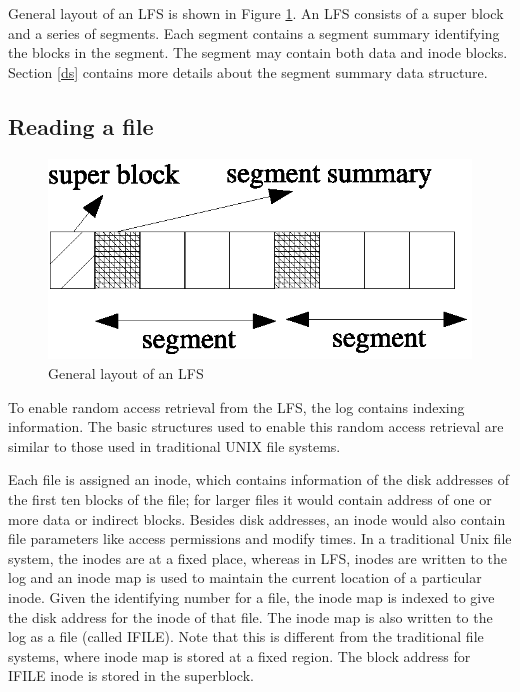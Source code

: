 \documentclass{article}
\begin{document}
General layout of an LFS is shown in Figure \ref{gen_struct}. An LFS consists
of a super block and a series of segments. Each segment contains a segment
summary identifying the blocks in the segment.  The segment may contain both
data and inode blocks. Section \ref{ds} contains more details about the
segment summary data structure.

\subsection{Reading a file}
\begin{figure}
\centering
\includegraphics[scale=0.7]{lfs1}
\caption{General layout of an LFS}
\label{gen_struct}
\end{figure}

To enable random access retrieval from the LFS, the log contains indexing
information. The basic structures used to enable this random  access retrieval 
are similar to those used in traditional UNIX file systems.

Each file is assigned an inode, which contains information of the disk
addresses of the first ten blocks of the file; for larger files it would
contain address of one or more data or indirect blocks. Besides disk
addresses, an inode would also contain file parameters like access permissions
and modify times. In a traditional Unix file system, the inodes are at a fixed
place, whereas in LFS, inodes are written to the log and an inode map is used
to maintain the current location of a particular inode. Given the identifying
number for a file, the inode map is indexed to give the disk address for the
inode of that file. The inode map is also written to the log as a file (called
IFILE). Note that this is different from the traditional file systems, where
inode map is stored at a fixed region. The block address for IFILE inode is
stored in the superblock.
\end{document}
